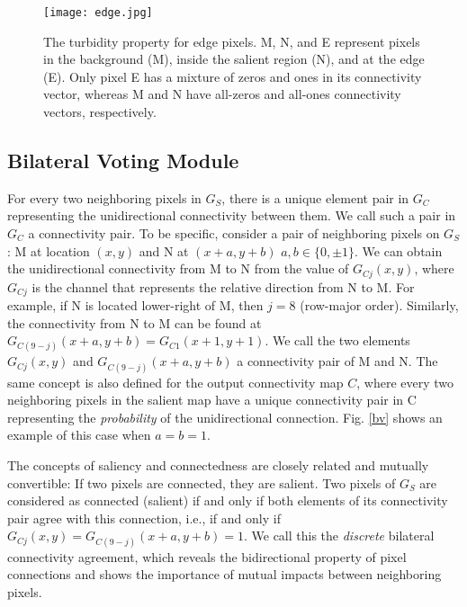 \documentclass[review]{cvpr}
\begin{document}
\begin{figure}[h!]
\begin{center}
\texttt{[image: edge.jpg]}
\end{center}
\vspace{-8pt}
   \caption{The turbidity property for edge pixels. M, N, and E represent pixels in the background (M), inside the salient region (N), and at the edge (E). Only pixel E has a mixture of zeros and ones in its connectivity vector, whereas M and N have all-zeros and all-ones connectivity vectors, respectively.}
   \vspace{-10pt}
\label{turbidity}
\end{figure}

\subsection{Bilateral Voting Module}

For every two neighboring pixels in $G_S$, there is a unique element pair in $G_C$ representing the unidirectional connectivity between them. We call such a pair in $G_C$ a connectivity pair. To be specific, consider a pair of neighboring pixels on $G_S$: M at location $(x,y)$ and N at $(x+a,y+b)$ $a,b \in \{ 0,\pm 1\}$. We can obtain the unidirectional connectivity from M to N from the value of $G_{Cj} (x,y)$, where  $G_{Cj}$ is the channel that represents the relative direction from N to M. For example, if N is located lower-right of M, then $j = 8$ (row-major order). Similarly, the connectivity from N to M can be found at $G_{C(9-j)}(x+a,y+b)=G_{C1}(x+1,y+1)$. We call the two elements $G_{Cj} (x,y)$ and $G_{C(9-j)}(x+a,y+b)$ a connectivity pair of M and N. The same concept is also defined for the output connectivity map $C$, where every two neighboring pixels in the salient map have a unique connectivity pair in C representing the  \textit{probability} of the unidirectional connection. Fig. \ref{bv} shows an example of this case when $a=b=1$.

The concepts of saliency and connectedness are closely related and mutually convertible: If two pixels are connected, they are salient. Two pixels of $G_S$ are considered as connected (salient) if and only if both elements of its connectivity pair agree with this connection, i.e., if and only if $G_{Cj}(x,y)=G_{C(9-j)}(x+a,y+b)=1$.
We call this the \textit{discrete} bilateral connectivity agreement, which reveals the bidirectional property of pixel connections and shows the importance of mutual impacts between neighboring pixels.
\end{document}
